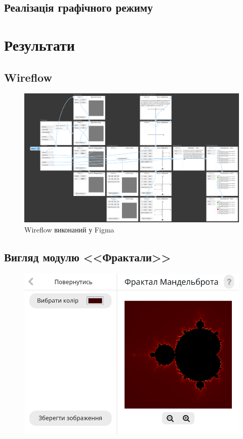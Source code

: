 \documentclass[oneside,14pt]{extarticle}
\begin{document}
\begin{normalsize}
	\subsection{Реалізація графічного режиму}
	
	\section{Результати}
	\subsection{Wireflow}
	\begin{figure}[H]
		\centering
		\includegraphics[scale=0.45]{wireflow}
		\caption{Wireflow виконаний у Figma}
	\end{figure}
	
	\subsection{Вигляд модулю <<Фрактали>>}
	\begin{figure}[H]
		\centering
		\includegraphics[scale=0.6]{11}
		\caption{}
	\end{figure}
	

\end{normalsize}
\end{document}
